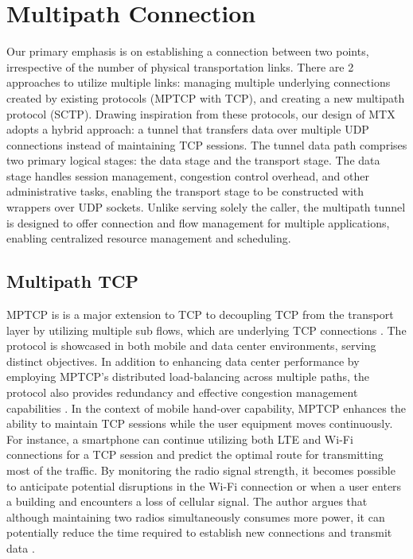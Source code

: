 \section{Multipath Connection}\label{sec:related_work:mp_connection}
Our primary emphasis is on establishing a connection between two points, irrespective of the number of physical transportation links.
There are 2 approaches to utilize multiple links: managing multiple underlying connections created by existing protocols (\ac{MPTCP} with TCP), and creating a new multipath protocol (\ac{SCTP}).
Drawing inspiration from these protocols, our design of \ac{MTX} adopts a hybrid approach: a tunnel that transfers data over multiple UDP connections instead of maintaining TCP sessions. 
The tunnel data path comprises two primary logical stages: the data stage and the transport stage. 
The data stage handles session management, congestion control overhead, and other administrative tasks, enabling the transport stage to be constructed with wrappers over UDP sockets.
Unlike serving solely the caller, the multipath tunnel is designed to offer connection and flow management for multiple applications, enabling centralized resource management and scheduling.

\subsection{Multipath TCP}\label{sec:related_work:mp_connection:MPTCP}

\ac{MPTCP} is is a major extension to TCP to decoupling TCP from the transport layer by utilizing multiple sub flows, which are underlying TCP connections \cite{Bonaventure_mptcp_decoupling}.
The protocol is showcased in both mobile and data center environments, serving distinct objectives. 
In addition to enhancing data center performance by employing \ac{MPTCP}'s distributed load-balancing across multiple paths, the protocol also provides redundancy and effective congestion management capabilities \cite{raiciu_improving_nodate}.
In the context of mobile hand-over capability, \ac{MPTCP} enhances the ability to maintain TCP sessions while the user equipment moves continuously. 
For instance, a smartphone can continue utilizing both LTE and Wi-Fi connections for a TCP session and predict the optimal route for transmitting most of the traffic. 
By monitoring the radio signal strength, it becomes possible to anticipate potential disruptions in the Wi-Fi connection or when a user enters a building and encounters a loss of cellular signal. 
The author argues that although maintaining two radios simultaneously consumes more power, it can potentially reduce the time required to establish new connections and transmit data \cite{paasch_multipath_2014}.

